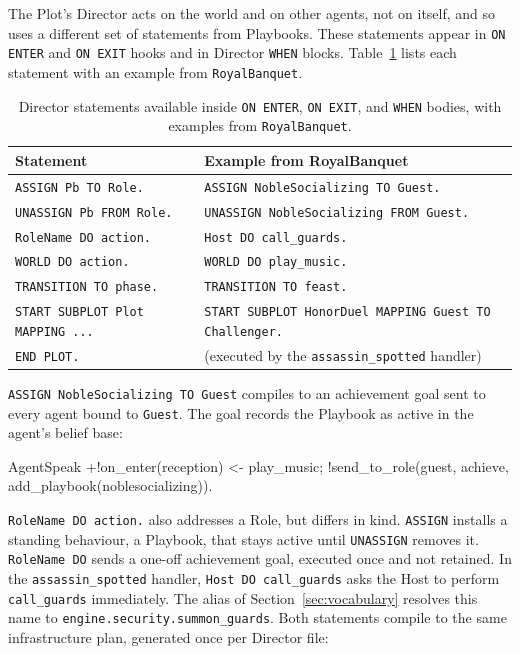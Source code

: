 The Plot's Director acts on the world and on other agents, not on itself, and so uses a different set of statements from Playbooks. These statements appear in \lstinline|ON ENTER| and \lstinline|ON EXIT| hooks and in Director \lstinline|WHEN| blocks. Table~\ref{tab:director-stmt-mapping} lists each statement with an example from \lstinline|RoyalBanquet|.
 
\begin{table}[h]
\centering
\begin{tabular}{|l|p{8cm}|}
\hline
\textbf{Statement} & \textbf{Example from RoyalBanquet} \\
\hline
\lstinline|ASSIGN Pb TO Role.| & \lstinline|ASSIGN NobleSocializing TO Guest.| \\
\lstinline|UNASSIGN Pb FROM Role.| & \lstinline|UNASSIGN NobleSocializing FROM Guest.| \\
\lstinline|RoleName DO action.| & \lstinline|Host DO call_guards.| \\
\lstinline|WORLD DO action.| & \lstinline|WORLD DO play_music.| \\
\lstinline|TRANSITION TO phase.| & \lstinline|TRANSITION TO feast.| \\
\lstinline|START SUBPLOT Plot MAPPING ...| & \lstinline|START SUBPLOT HonorDuel MAPPING Guest TO Challenger.| \\
\lstinline|END PLOT.| & (executed by the \lstinline|assassin_spotted| handler) \\
\hline
\end{tabular}
\caption{Director statements available inside \lstinline|ON ENTER|, \lstinline|ON EXIT|, and \lstinline|WHEN| bodies, with examples from \lstinline|RoyalBanquet|.}
\label{tab:director-stmt-mapping}
\end{table}
 
\lstinline|ASSIGN NobleSocializing TO Guest| compiles to an achievement goal sent to every agent bound to \lstinline|Guest|. The goal records the Playbook as active in the agent's belief base:
 
\begin{codeblock}[]{AgentSpeak}
+!on_enter(reception) <-
    play_music;
    !send_to_role(guest, achieve, add_playbook(noblesocializing)).
\end{codeblock}
 
\lstinline|RoleName DO action.| also addresses a Role, but differs in kind. \lstinline|ASSIGN| installs a standing behaviour, a Playbook, that stays active until \lstinline|UNASSIGN| removes it. \lstinline|RoleName DO| sends a one-off achievement goal, executed once and not retained. In the \lstinline|assassin_spotted| handler, \lstinline|Host DO call_guards| asks the Host to perform \lstinline|call_guards| immediately. The alias of Section~\ref{sec:vocabulary} resolves this name to \lstinline|engine.security.summon_guards|. Both statements compile to the same infrastructure plan, generated once per Director file:
 
